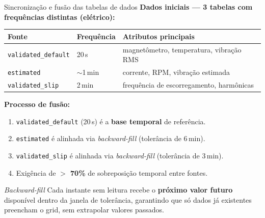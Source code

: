 \documentclass{beamer}
\begin{document}
\begin{frame}{Sincronização e fusão das tabelas de dados}
    \textbf{Dados iniciais --- 3 tabelas com frequências distintas (elétrico):}
    \vspace{0.1cm}

    \footnotesize
    \begin{tabular}{lll}
        \hline
        \textbf{Fonte} & \textbf{Frequência} & \textbf{Atributos principais} \\
        \hline
        \texttt{validated\_default} & 20\,s & magnetômetro, temperatura, vibração RMS \\
        \texttt{estimated}         & $\sim$1\,min & corrente, RPM, vibração estimada \\
        \texttt{validated\_slip}   & 2\,min & frequência de escorregamento, harmônicas \\
        \hline
    \end{tabular}
    \normalsize

    \vspace{0.3cm}
    \textbf{Processo de fusão:}
    \begin{enumerate}
        \item \texttt{validated\_default} (20\,s) é a \textbf{base temporal} de referência.
        \item \texttt{estimated} é alinhada via \textit{backward-fill} (tolerância de 6\,min).
        \item \texttt{validated\_slip} é alinhada via \textit{backward-fill} (tolerância de 3\,min).
        \item Exigência de \textbf{$>$ 70\%} de sobreposição temporal entre fontes.
    \end{enumerate}

    \begin{block}{\textit{Backward-fill}}
        Cada instante sem leitura recebe o \textbf{próximo valor futuro} disponível dentro da janela de tolerância, garantindo que só dados já existentes preencham o grid, sem extrapolar valores passados.
    \end{block}
\end{frame}
\end{document}
